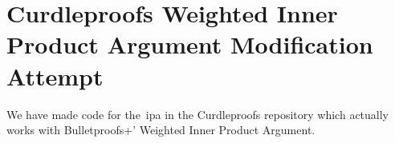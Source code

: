 
\section{Curdleproofs Weighted Inner Product Argument Modification Attempt}\label{app:curdleproofs-weighted-inner-product-argument-modification-attempt}
We have made code for the~\gls{ipa} in the Curdleproofs repository which actually works with Bulletproofs+' Weighted Inner Product Argument.
